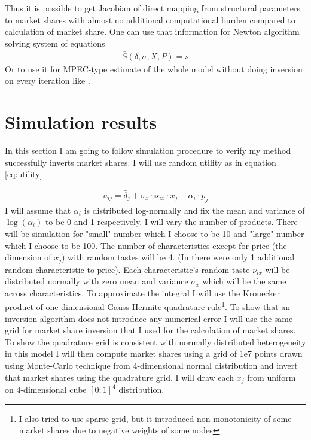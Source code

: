 \documentclass[12pt,letterpaper]{article}
\begin{document}
	Thus it is possible to get Jacobian of direct mapping from structural parameters to market shares with almost no additional computational burden compared to calculation of market share. One can use that information for Newton algorithm solving system of equations 
	\begin{align}
	\bar S(\delta,\sigma,X,P) = \bar s
	\end{align}
	Or to use it for MPEC-type estimate of the whole model without doing inversion on every iteration like \cite{Fox2011}.
	
	\section{Simulation results}
	
	In this section I am going to follow \cite{berry2007pure} simulation procedure to verify my method successfully inverts market shares. I will use random utility as in equation \ref{eq:utility}
	
	\begin{align}
		u_{ij} = {\bar \delta_j} + \sigma_x \cdot \boldsymbol{\nu}_{ix} \cdot x_j - \alpha_i\cdot p_j
	\end{align}
	I will assume that $\alpha_i$ is distributed log-normally and fix the mean and variance of $\log(\alpha_i)$ to be 0 and 1 respectively. I will vary the number of products. There will be simulation for "small" number which I choose to be 10 and "large" number which I choose to be 100. The number of characteristics except for price (the dimension of $x_j$) with random tastes will be 4. (In \cite{berry2007pure} there were only 1 additional random characteristic to price). Each characteristic's random taste $\nu_{ix}$ will be distributed normally with zero mean and variance $\sigma_x$ which will be the same across characteristics. To approximate the integral I will use the Kronecker product of one-dimensional Gauss-Hermite quadrature rule\footnote{I also tried to use sparse grid, but it introduced non-monotonicity of some market shares due to negative weights of some nodes}. To show that an inversion algorithm does not introduce any numerical error I will use the same grid for market share inversion that I used for the calculation of market shares. To show the quadrature grid is consistent with normally distributed heterogeneity in this model I will then compute market shares using a grid of 1e7 points drawn using Monte-Carlo technique from 4-dimensional normal distribution and invert that market shares using the quadrature grid. I will draw  each $x_j$ from uniform on 4-dimensional cube $[0; 1]^4$ distribution. 
	
\end{document}
